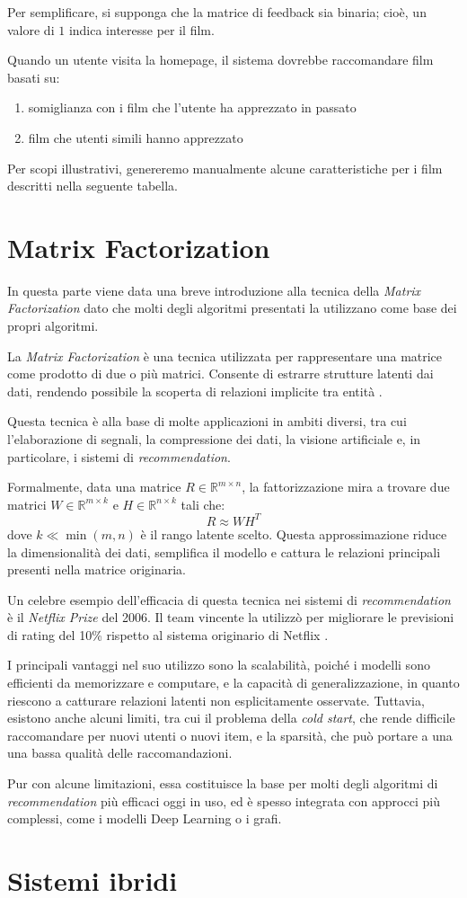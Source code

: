 Per semplificare, si supponga che la matrice di feedback sia binaria; cioè, un valore di $1$ indica interesse per il film.

Quando un utente visita la homepage, il sistema dovrebbe raccomandare film basati su:

\begin{enumerate}
    \item somiglianza con i film che l'utente ha apprezzato in passato
    \item film che utenti simili hanno apprezzato
\end{enumerate}

Per scopi illustrativi, genereremo manualmente alcune caratteristiche per i film descritti nella seguente tabella.
    

\section{Matrix Factorization}

In questa parte viene data una breve introduzione alla tecnica della \textit{Matrix Factorization} dato che molti degli algoritmi presentati la utilizzano come base dei propri algoritmi.

La \textit{Matrix Factorization} è una tecnica utilizzata per rappresentare una matrice come prodotto di due o più matrici. Consente di estrarre strutture latenti dai dati, rendendo possibile la scoperta di relazioni implicite tra entità \cite{MC}.

Questa tecnica è alla base di molte applicazioni in ambiti diversi, tra cui l'elaborazione di segnali, la compressione dei dati, la visione artificiale e, in particolare, i sistemi di \textit{recommendation}.

Formalmente, data una matrice $R \in \mathbb{R}^{m \times n}$, la fattorizzazione mira a trovare due matrici $W \in \mathbb{R}^{m \times k}$ e $H \in \mathbb{R}^{n \times k}$ tali che:
\[
R \approx WH^T
\]
dove $k \ll \min(m,n)$ è il rango latente scelto. Questa approssimazione riduce la dimensionalità dei dati, semplifica il modello e cattura le relazioni principali presenti nella matrice originaria.

Un celebre esempio dell'efficacia di questa tecnica nei sistemi di \textit{recommendation} è il \textit{Netflix Prize} del 2006. Il team vincente la utilizzò per migliorare le previsioni di rating del 10\% rispetto al sistema originario di Netflix \cite{TheNP}.

I principali vantaggi nel suo utilizzo sono la scalabilità, poiché i modelli sono efficienti da memorizzare e computare, e la capacità di generalizzazione, in quanto riescono a catturare relazioni latenti non esplicitamente osservate. Tuttavia, esistono anche alcuni limiti, tra cui il problema della \textit{cold start}, che rende difficile raccomandare per nuovi utenti o nuovi item, e la sparsità, che può portare a una una bassa qualità delle raccomandazioni\cite{SVD_analysis}.

Pur con alcune limitazioni, essa costituisce la base per molti degli algoritmi di \textit{recommendation} più efficaci oggi in uso, ed è spesso integrata con approcci più complessi, come i modelli Deep Learning o i grafi.


\section{Sistemi ibridi}